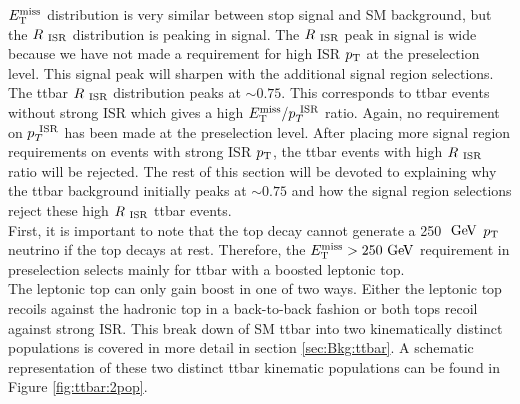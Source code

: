 \indent  $E_{\mathrm{T}}^{\mathrm{miss}}$ distribution is very similar between stop signal and SM background, but the $R_{~\mathrm{ISR}}$ distribution is peaking in signal.  The $R_{~\mathrm{ISR}}$ peak in signal is wide because we have not made a requirement for high ISR $p_{\mathrm{T}}$ at the preselection level.  This signal peak will sharpen with the additional signal region selections.  \\

\indent The ttbar $R_{~\mathrm{ISR}}$ distribution peaks at $\sim0.75$.  This corresponds to ttbar events without strong ISR which gives a high $E_{\mathrm{T}}^{\mathrm{miss}}/p_{T}^{~\mathrm{ISR}}$ ratio.  Again, no requirement on $p_{T}^{~\mathrm{ISR}}$ has been made at the preselection level.  After placing more signal region requirements on events with strong ISR $p_{\mathrm{T}}$,  the ttbar events with high $R_{~\mathrm{ISR}}$ ratio will be rejected.  The rest of this section will be devoted to explaining why the ttbar background initially peaks at $\sim0.75$ and how the signal region selections reject these high $R_{~\mathrm{ISR}}$ ttbar events.  \\

\indent First, it is important to note that the top decay cannot generate a 250 $\gev$ $p_{\mathrm{T}}$ neutrino if the top decays at rest.  Therefore, the $\MET > 250 \gev$ requirement in preselection selects mainly for ttbar with a boosted leptonic top.   \\

\indent  The leptonic top can only gain boost in one of two ways.  Either the leptonic top recoils against the hadronic top in a back-to-back fashion or both tops recoil against strong ISR.  This break down of SM ttbar into two kinematically distinct populations is covered in more detail in section \ref{sec:Bkg:ttbar}.  A schematic representation of these two distinct ttbar kinematic populations can be found in Figure \ref{fig:ttbar:2pop}. \\

